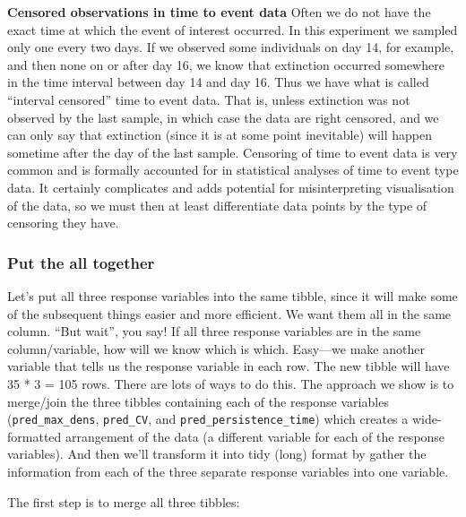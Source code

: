 \documentclass[]{book}
\makeatletter
\newenvironment{Shaded}{\begin{snugshade}}{\end{snugshade}}
\newcommand{\KeywordTok}[1]{\textcolor[rgb]{0.13,0.29,0.53}{\textbf{#1}}}
\newcommand{\NormalTok}[1]{#1}
\newcommand{\OperatorTok}[1]{\textcolor[rgb]{0.81,0.36,0.00}{\textbf{#1}}}
\newcommand{\StringTok}[1]{\textcolor[rgb]{0.31,0.60,0.02}{#1}}
\newenvironment{kframe}{%
\medskip{}
\setlength{\fboxsep}{.8em}
 \def\at@end@of@kframe{}%
 \ifinner\ifhmode%
  \def\at@end@of@kframe{\end{minipage}}%
  \begin{minipage}{\columnwidth}%
 \fi\fi%
 \def\FrameCommand##1{\hskip\@totalleftmargin \hskip-\fboxsep
 \colorbox{shadecolor}{##1}\hskip-\fboxsep
     \hskip-\linewidth \hskip-\@totalleftmargin \hskip\columnwidth}%
 \MakeFramed {\advance\hsize-\width
   \@totalleftmargin\z@ \linewidth\hsize
   \@setminipage}}%
 {\par\unskip\endMakeFramed%
 \at@end@of@kframe}
\newenvironment{rmdblock}[1]
  {
  \begin{itemize}
  \renewcommand{\labelitemi}{
    \raisebox{-.7\height}[0pt][0pt]{
      {\setkeys{Gin}{width=3em,keepaspectratio}\texttt{[image: images/\#1]}}
    }
  }
  \setlength{\fboxsep}{1em}
  \begin{kframe}
  \item
  }
  {
  \end{kframe}
  \end{itemize}
  }
\newenvironment{info}
  {\begin{rmdblock}{info}}
  {\end{rmdblock}}
\makeatother
\begin{document}
\begin{info}
\textbf{Censored observations in time to event data} Often we do not
have the exact time at which the event of interest occurred. In this
experiment we sampled only one every two days. If we observed some
individuals on day 14, for example, and then none on or after day 16, we
know that extinction occurred somewhere in the time interval between day
14 and day 16. Thus we have what is called ``interval censored'' time to
event data. That is, unless extinction was not observed by the last
sample, in which case the data are right censored, and we can only say
that extinction (since it is at some point inevitable) will happen
sometime after the day of the last sample. Censoring of time to event
data is very common and is formally accounted for in statistical
analyses of time to event type data. It certainly complicates and adds
potential for misinterpreting visualisation of the data, so we must then
at least differentiate data points by the type of censoring they have.
\end{info}

\hypertarget{put-the-all-together}{%
\subsubsection{Put the all together}\label{put-the-all-together}}

Let's put all three response variables into the same tibble, since it will make some of the subsequent things easier and more efficient. We want them all in the same column. ``But wait'', you say! If all three response variables are in the same column/variable, how will we know which is which. Easy---we make another variable that tells us the response variable in each row. The new tibble will have 35 * 3 = 105 rows. There are lots of ways to do this. The approach we show is to merge/join the three tibbles containing each of the response variables (\texttt{pred\_max\_dens}, \texttt{pred\_CV}, and \texttt{pred\_persistence\_time}) which creates a wide-formatted arrangement of the data (a different variable for each of the response variables). And then we'll transform it into tidy (long) format by gather the information from each of the three separate response variables into one variable.

The first step is to merge all three tibbles:

\begin{Shaded}
\end{Shaded}
\end{document}
